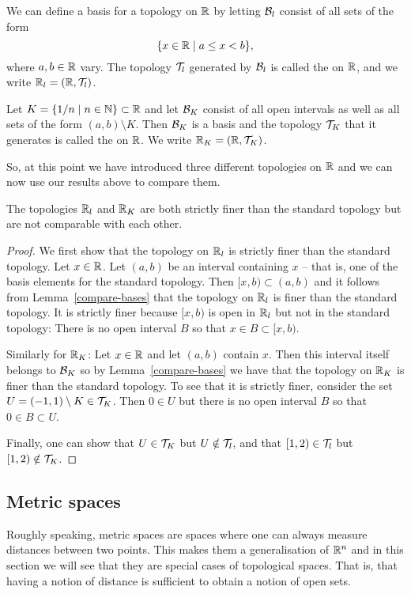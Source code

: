 \begin{example}
  We can define a basis for a topology on $\mathbb{R}$ by letting $\mathcal{B}_l$ consist of all sets of the form
  \[
    \{ x \in \mathbb{R} \mid a \leq x < b \},
  \]
  where $a, b \in \mathbb{R}$ vary. The topology $\mathcal{T}_l$ generated by $\mathcal{B}_l$ is called the  on $\mathbb{R}$, and we write $\mathbb{R}_l = (\mathbb{R},\mathcal{T}_l)$.
\end{example}
\begin{example}
  Let $K = \{ 1/n \mid n \in \mathbb{N} \} \subset \mathbb{R}$ and let $\mathcal{B}_K$ consist of all open intervals as well as all sets of the form $(a,b) \setminus K$. Then $\mathcal{B}_K$ is a basis and the topology $\mathcal{T}_K$ that it generates is called the  on $\mathbb{R}$. We write $\mathbb{R}_K = (\mathbb{R},\mathcal{T}_K)$.
\end{example}
So, at this point we have introduced three different topologies on $\mathbb{R}$ and we can now use our results above to compare them.
\begin{lem}
  The topologies $\mathbb{R}_l$ and $\mathbb{R}_K$ are both strictly finer than the standard topology but are not comparable with each other.
\end{lem}
\begin{proof}
  We first show that the topology on $\mathbb{R}_l$ is strictly finer than the standard topology. Let $x \in \mathbb{R}$. Let $(a,b)$ be an interval containing $x$ -- that is, one of the basis elements for the standard topology. Then $[x,b) \subset (a,b)$ and it follows from Lemma~\ref{compare-bases} that the topology on $\mathbb{R}_l$ is finer than the standard topology. It is strictly finer because $[x,b)$ is open in $\mathbb{R}_l$ but not in the standard topology: There is no open interval $B$ so that $x \in B \subset [x,b)$.
  
  Similarly for $\mathbb{R}_K$: Let $x \in \mathbb{R}$ and let $(a,b)$ contain $x$. Then this interval itself belongs to $\mathcal{B}_K$ so by Lemma~\ref{compare-bases} we have that the topology on $\mathbb{R}_K$ is finer than the standard topology. To see that it is strictly finer, consider the set $U = (-1,1) \setminus K \in \mathcal{T}_K$. Then $0 \in U$ but there is no open interval $B$ so that $0 \in B \subset U$.
  
  Finally, one can show that $U \in \mathcal{T}_K$ but $U \notin \mathcal{T}_l$, and that $[1,2) \in \mathcal{T}_l$ but $[1,2) \notin \mathcal{T}_K$.
\end{proof}

\subsection{Metric spaces}
Roughly speaking, metric spaces are spaces where one can always measure distances between two points. This makes them a generalisation of $\mathbb{R}^n$ and in this section we will see that they are special cases of topological spaces. That is, that having a notion of distance is sufficient to obtain a notion of open sets.

